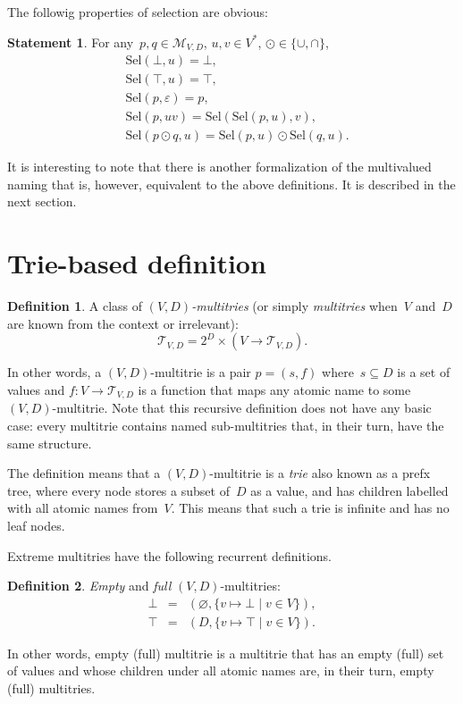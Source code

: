 \documentclass{article}
\theoremstyle{definition}
\newtheorem{Df}{Definition}
\newtheorem{St}{Statement}
\newcommand{\setcharmvcn}{M}
\newcommand{\setcharmt}{T}
\newcommand{\setsymbol}[3]{\mathcal{#1}_{#2,#3}}
\newcommand{\setmvcn}[2]{\setsymbol{\setcharmvcn}{#1}{#2}}
\newcommand{\setmt}[2]{\setsymbol{\setcharmt}{#1}{#2}}
\newcommand{\select}{\mathrm{Sel}}
\begin{document}
The followig properties of selection are obvious:
\begin{St}\label{st:mvcn-selection-properties}
For any~$p,q\in\setmvcn{V}{D}$, $u, v\in V^\ast$, $\odot\in\{\cup, \cap\}$,
\begin{eqnarray*}
  & \select(\bot,u) = \bot, \\
  & \select(\top,u) = \top, \\
  & \select(p,\varepsilon) = p, \\
  & \select(p,uv) = \select(\select(p,u), v), \\
  & \select(p\odot q, u) = \select(p,u)\odot \select(q,u).
\end{eqnarray*}
\end{St}

It is interesting to note that there is another formalization of the
multivalued naming that is, however, equivalent to the above definitions.  It
is described in the next section.


\section{Trie-based definition}

\begin{Df}\label{df:mt}
A class of \emph{$(V,D)$-multitries} (or simply \emph{multitries} when~$V$
and~$D$ are known from the context or irrelevant):
\[
  \setmt{V}{D} = 2^D \times (V \to \setmt{V}{D}) .
\]
\end{Df}

In other words, a $(V,D)$-multitrie is a pair $p = (s, f)$ where~$s\subseteq D$
is a set of values and $f: V \to \setmt{V}{D}$ is a function that maps any
atomic name to some $(V,D)$-multitrie. Note that this recursive definition does
not have any basic case: every multitrie contains named sub-multitries that, in
their turn, have the same structure.

The definition means that a $(V,D)$-multitrie is a \emph{trie} also known as
a prefx tree, where every node stores a subset of~$D$ as a value, and has
children labelled with all atomic names from~$V$. This means that such a trie
is infinite and has no leaf nodes.

Extreme multitries have the following recurrent definitions.
\begin{Df}\label{df:mt-extreme}
\emph{Empty} and \emph{full} $(V,D)$-multitries:
\begin{eqnarray*}
  \bot & = & ( \varnothing, \{ v \mapsto \bot \mid v\in V \} ) , \\
  \top & = & ( D,           \{ v \mapsto \top \mid v\in V \} ) .
\end{eqnarray*}
\end{Df}
In other words, empty (full) multitrie is a multitrie that has an empty
(full) set of values and whose children under all atomic names are, in their
turn, empty (full) multitries.
\end{document}
